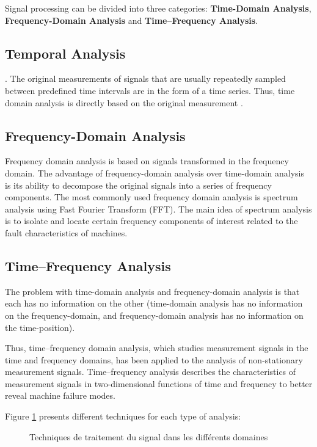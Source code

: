 Signal processing can be divided into three categories: \textbf{Time-Domain Analysis}, \textbf{Frequency-Domain Analysis} and \textbf{Time--Frequency Analysis}.

\subsection{Temporal Analysis}.
The original measurements of signals that are usually repeatedly sampled between predefined time intervals are in the form of a time series. Thus, time domain analysis is directly based on the original measurement \cite{Lei2016}.

\subsection{Frequency-Domain Analysis}
Frequency domain analysis is based on signals transformed in the frequency domain. The advantage of frequency-domain analysis over time-domain analysis is its ability to decompose the original signals into a series of frequency components. The most commonly used frequency domain analysis is spectrum analysis using Fast Fourier Transform (FFT). The main idea of spectrum analysis is to isolate and locate certain frequency components of interest related to the fault characteristics of \cite{Lei2016a} machines.

\subsection{Time--Frequency Analysis}
The problem with time-domain analysis and frequency-domain analysis is that each has no information on the other (time-domain analysis has no information on the frequency-domain, and frequency-domain analysis has no information on the time-position).

Thus, time--frequency domain analysis, which
studies measurement signals in the time and frequency domains, has been applied to the analysis of non-stationary measurement signals. Time--frequency analysis describes the characteristics of measurement signals in two-dimensional functions of time and frequency to better reveal machine failure modes.

Figure \ref{fig:signal-processing} presents different techniques for each type of analysis:

\begin{figure}[h]
    \centering
	
    \caption{Techniques de traitement du signal dans les différents domaines}
    \label{fig:signal-processing}
\end{figure}

